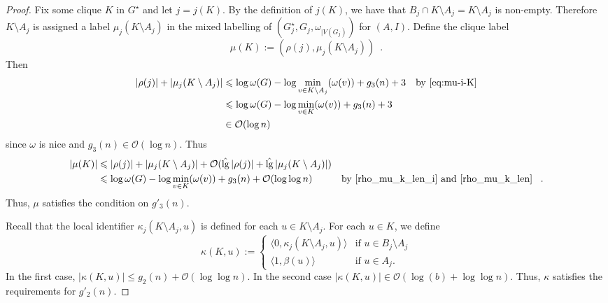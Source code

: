 \documentclass{patmorin}
\let\eqref\cref
\renewcommand{\le}{\leqslant}
\newcommand{\pat}[1]{\noindent\textcolor{Magenta}{PaMo: #1}}
\DeclareMathOperator{\lgg}{\hat{lg}}
\newcommand{\Oh}{\calO}
\newcommand{\calK}{\mathcal{K}}
\newcommand{\calO}{\mathcal{O}}
\begin{document}
\begin{proof}
    Fix some clique $K$ in $G^\star$  and let $j=j(K)$.  By the definition of $j(K)$, we have that $B_j\cap K\setminus A_j=K\setminus A_j$ is non-empty.
    Therefore $K\setminus A_j$ is assigned a label $\mu_j(K\setminus A_j)$ in the mixed labelling of $(G^\star_j,G_j,\omega_{|V(G_j)})$ for $(A,I)$.
    Define the clique label
    \[
        \mu(K):=(\rho(j),\mu_j(K\setminus A_j)) \enspace .
    \]
    Then
    \begin{align}
       |\rho(j)|+|\mu_j(K\setminus A_j)|
       & \le \log\omega(G)-\log\min_{v\in K\setminus A_j}(\omega(v))+g_3(n)+3 &\textrm{by~\eqref{eq:mu-i-K}} \\
       & \le \log\omega(G)-\log\min_{v\in K}(\omega(v))+g_3(n)+3   \label{rho_mu_k_len_i} \\
       & \in \Oh(\log n)
       \label{rho_mu_k_len}
    \end{align}
    since $\omega$ is nice and $g_3(n)\in\Oh(\log n)$.  Thus
    \begin{align*}
        |\mu(K)|
        & \le |\rho(j)|+|\mu_j(K\setminus A_j)| + \Oh(\lgg|\rho(j)|+\lgg|\mu_j(K\setminus A_j)|) \\
        & \le \log\omega(G)-\log\min_{v\in K}(\omega(v)) + g_3(n)+\Oh(\log\log n) & \text{by \eqref{rho_mu_k_len_i} and \eqref{rho_mu_k_len} } \enspace .
    \end{align*}
    Thus, $\mu$ satisfies the condition on $g'_3(n)$.

    Recall that the local identifier $\kappa_j(K\setminus A_j,u)$ is defined for each $u\in K\setminus A_j$.
    For each $u\in K$, we define
    \[
         \kappa(K,u):=
         \begin{cases}
           \langle 0,\kappa_j(K\setminus A_j,u)\rangle & \text{if $u\in B_j\setminus A_j$} \\
           \langle 1,\beta(u)\rangle & \text{if $u\in A_j$.}
         \end{cases}
     \]
     In the first case, $|\kappa(K,u)|\le g_2(n)+\Oh(\log\log n)$.
     In the second case $|\kappa(K,u)|\in \Oh(\log (b)+\log\log n)$.  Thus, $\kappa$ satisfies the requirements for $g'_2(n)$.



\end{proof}
\end{document}
